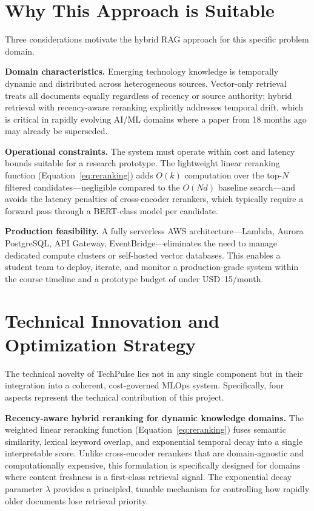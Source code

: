 \documentclass[12pt,a4paper]{report}
\begin{document}
\section{Why This Approach is Suitable}
\label{sec:method_rationale}

Three considerations motivate the hybrid RAG approach for this specific problem domain.

\textbf{Domain characteristics.} Emerging technology knowledge is temporally dynamic and distributed across heterogeneous sources. Vector-only retrieval treats all documents equally regardless of recency or source authority; hybrid retrieval with recency-aware reranking explicitly addresses temporal drift, which is critical in rapidly evolving AI/ML domains where a paper from 18 months ago may already be superseded.

\textbf{Operational constraints.} The system must operate within cost and latency bounds suitable for a research prototype. The lightweight linear reranking function (Equation~\ref{eq:reranking}) adds $O(k)$ computation over the top-$N$ filtered candidates—negligible compared to the $O(Nd)$ baseline search—and avoids the latency penalties of cross-encoder rerankers, which typically require a forward pass through a BERT-class model per candidate.

\textbf{Production feasibility.} A fully serverless AWS architecture—Lambda, Aurora PostgreSQL, API Gateway, EventBridge—eliminates the need to manage dedicated compute clusters or self-hosted vector databases. This enables a student team to deploy, iterate, and monitor a production-grade system within the course timeline and a prototype budget of under USD~15/month.

\section{Technical Innovation and Optimization Strategy}
\label{sec:innovation}

The technical novelty of TechPulse lies not in any single component but in their integration into a coherent, cost-governed MLOps system. Specifically, four aspects represent the technical contribution of this project.

\textbf{Recency-aware hybrid reranking for dynamic knowledge domains.} The weighted linear reranking function (Equation~\ref{eq:reranking}) fuses semantic similarity, lexical keyword overlap, and exponential temporal decay into a single interpretable score. Unlike cross-encoder rerankers that are domain-agnostic and computationally expensive, this formulation is specifically designed for domains where content freshness is a first-class retrieval signal. The exponential decay parameter $\lambda$ provides a principled, tunable mechanism for controlling how rapidly older documents lose retrieval priority.
\end{document}
